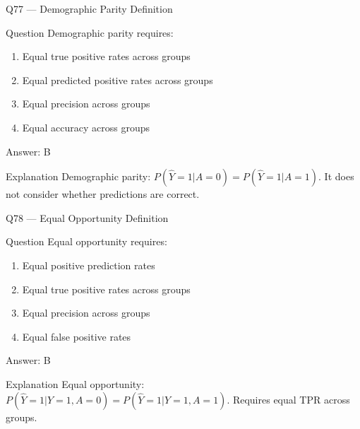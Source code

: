 \documentclass[aspectratio=169,8pt]{beamer}
\begin{document}
	\begin{frame}{Q77 --- Demographic Parity Definition}
		\begin{block}{Question}
			Demographic parity requires:
			\begin{enumerate}
				\item Equal true positive rates across groups
				\item Equal predicted positive rates across groups
				\item Equal precision across groups
				\item Equal accuracy across groups
			\end{enumerate}
		\end{block}
		\begin{exampleblock}{Answer: B}\end{exampleblock}
		\begin{block}{Explanation}
			Demographic parity: $P(\hat{Y}=1 | A=0) = P(\hat{Y}=1 | A=1)$. It does not consider whether predictions are correct.
		\end{block}
	\end{frame}
	
	\begin{frame}{Q78 --- Equal Opportunity Definition}
		\begin{block}{Question}
			Equal opportunity requires:
			\begin{enumerate}
				\item Equal positive prediction rates
				\item Equal true positive rates across groups
				\item Equal precision across groups
				\item Equal false positive rates
			\end{enumerate}
		\end{block}
		\begin{exampleblock}{Answer: B}\end{exampleblock}
		\begin{block}{Explanation}
			Equal opportunity: $P(\hat{Y}=1 | Y=1, A=0) = P(\hat{Y}=1 | Y=1, A=1)$. Requires equal TPR across groups.
		\end{block}
	\end{frame}
	
\end{document}
